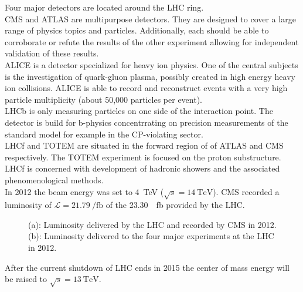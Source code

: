 Four major detectors are located around the LHC ring. \\
CMS \cite{cmsTDR1} and ATLAS \cite{AtlasTDR} are multipurpose detectors. They are designed to cover a large range of physics topics and particles. Additionally, each should be able to corroborate or refute the results of the other experiment allowing for independent validation of these results.\\
ALICE \cite{AliceTDR} is a detector specialized for heavy ion physics. One of the central subjects is the investigation of quark-gluon plasma, possibly created in high energy heavy ion collisions. ALICE is able to record and reconstruct events with a very high particle multiplicity (about 50,000 particles per event). \\
LHCb \cite{LHCbTDR} is only measuring particles on one side of the interaction point. The detector is build for b-physics concentrrating on precision measurements of the standard model for example in the CP-violating sector.\\
LHCf \cite{LHCfTDR} and TOTEM \cite{TOTEMTDR} are situated in the forward region of of ATLAS and CMS respectively. The TOTEM experiment is focused on the proton substructure. LHCf is concerned with development of hadronic showers and the associated phenomenological methods. \\
In 2012 the beam energy was set to \SI{4}{\tera \electronvolt} ($\sqrt{s} = \SI{14}{\tera \electronvolt}$). CMS recorded a luminosity of $\mathcal{L} = \SI{21.79}{\per \femto \barn}$ of the \SI{23.30}{\per \femto \barn} provided by the LHC. \\

\begin{figure}[ht]
  \caption{(a): Luminosity delivered by the LHC and recorded by CMS in 2012.\cite{lumi_cms} (b): Luminosity delivered to the four major experiments at the LHC in 2012.\cite{lumi_lhc}}
  \label{fig_det_lumi}
\end{figure}

After the current shutdown of LHC ends in 2015 the center of mass energy will be raised to $\sqrt{s} = \SI{13}{\tera \electronvolt}$.

